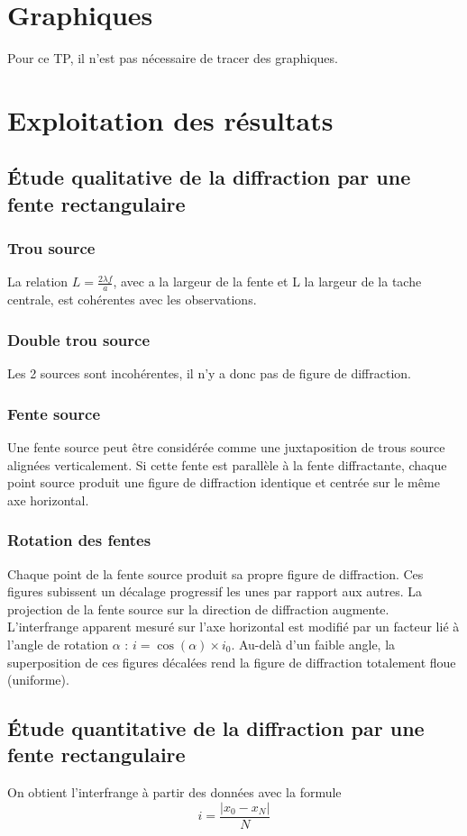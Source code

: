 \documentclass[a4paper,9pt,french]{scrartcl}
\begin{document}
\section{Graphiques}
Pour ce TP, il n'est pas nécessaire de tracer des graphiques.

\section{Exploitation des résultats}
\subsection{Étude qualitative de la diffraction par une fente rectangulaire}
\subsubsection{Trou source}
La relation \(L = \frac{2\lambda f}{a}\), avec a la largeur de la fente et L la largeur de la tache centrale, est cohérentes avec les observations.
\subsubsection{Double trou source}
Les 2 sources sont incohérentes, il n'y a donc pas de figure de diffraction.
\subsubsection{Fente source}
Une fente source peut être considérée comme une juxtaposition de trous source alignées verticalement. Si cette fente est parallèle à la fente diffractante, chaque point source produit une figure de diffraction identique et centrée sur le même axe horizontal.
\subsubsection{Rotation des fentes}
Chaque point de la fente source produit sa propre figure de diffraction. Ces figures subissent un décalage progressif les unes par rapport aux autres. La projection de la fente source sur la direction de diffraction augmente. L'interfrange apparent mesuré sur l'axe horizontal est modifié par un facteur lié à l'angle de rotation \(\alpha\) : \(i=\cos(\alpha)\times i_0\). Au-delà d'un faible angle, la superposition de ces figures décalées rend la figure de diffraction totalement floue (uniforme).
\subsection{Étude quantitative de la diffraction par une fente rectangulaire}
On obtient l'interfrange à partir des données avec la formule \begin{equation}
                                                               i = \frac{|x_0-x_N|}{N}
                                                              \end{equation}
\end{document}
